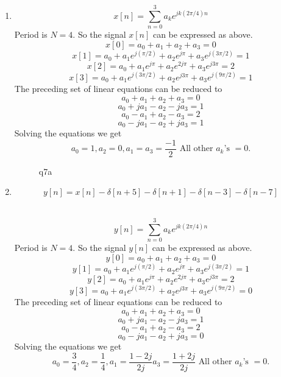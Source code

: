 \documentclass[10pt,a4paper, margin=1in]{article}
\begin{document}
\begin{enumerate}
\begin{enumerate}
    \item %
    \[ x[n] = \sum_{n=0}^{3} a_k e^{jk(2\pi/4) n} \] 
    Period is $N=4$. So the signal $x[n]$ can be expressed as above.
    \[x[0] = a_0 + a_1 + a_2 + a_3 = 0\]
    \[x[1] = a_0 + a_1 e^{j(\pi/2)} + a_2 e^{j\pi} + a_3 e^{j(3\pi/2)} = 1\]
    \[x[2] = a_0 + a_1 e^{j\pi} + a_2 e^{2j\pi} + a_3 e^{j3\pi} = 2\]
    \[x[3] = a_0 + a_1 e^{j(3\pi/2)} + a_2 e^{j3\pi} + a_3 e^{j(9\pi/2)} = 1\]
    The preceding set of linear equations can be reduced to
    \[a_0 + a_1 + a_2 + a_3 = 0\]
    \[a_0 + ja_1 - a_2 - ja_3 = 1\]
    \[a_0 - a_1 + a_2 - a_3 = 2\]
    \[a_0 - ja_1 - a_2 + ja_3 = 1\]
    Solving the equations we get
    \[ a_0 = 1, a_2 = 0, a_1 = a_3 = \frac{-1}{2} \text{ All other } a_k \text{'s } = 0. \]
    \begin{figure} [H]
        \centering
        \caption{q7a}
        \label{fig:q7a}
    \end{figure}
    
      
    \item %
    
    
    \[ y[n] = x[n] - \delta[n + 5] - \delta[n + 1] - \delta[n - 3] - \delta[n - 7] \]
    
    ~ \\
    
    \[ y[n] = \sum_{n=0}^{3} a_k e^{jk(2\pi/4) n} \] 
    Period is $N=4$. So the signal $y[n]$ can be expressed as above.
    \[ y[0] = a_0 + a_1 + a_2 + a_3 = 0\]
    \[ y[1] = a_0 + a_1 e^{j(\pi/2)} + a_2 e^{j\pi} + a_3 e^{j(3\pi/2)} = 1\]
    \[ y[2] = a_0 + a_1 e^{j\pi} + a_2 e^{2j\pi} + a_3 e^{j3\pi} = 2\]
    \[ y[3] = a_0 + a_1 e^{j(3\pi/2)} + a_2 e^{j3\pi} + a_3 e^{j(9\pi/2)} = 0\]
    The preceding set of linear equations can be reduced to
    \[a_0 + a_1 + a_2 + a_3 = 0\]
    \[a_0 + ja_1 - a_2 - ja_3 = 1\]
    \[a_0 - a_1 + a_2 - a_3 = 2\]
    \[a_0 - ja_1 - a_2 + ja_3 = 0\]
    Solving the equations we get
    \[ a_0 = \frac{3}{4}, a_2 = \frac{1}{4}, a_1 = \frac{1-2j}{2j} a_3 = \frac{1+2j}{2j} \text{ All other } a_k \text{'s } = 0. \]
    

\end{enumerate}
\end{enumerate}
\end{document}
